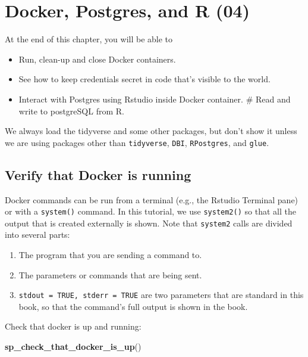 \documentclass[]{book}
\newenvironment{Shaded}{\begin{snugshade}}{\end{snugshade}}
\newcommand{\KeywordTok}[1]{\textcolor[rgb]{0.13,0.29,0.53}{\textbf{#1}}}
\newcommand{\NormalTok}[1]{#1}
\providecommand{\tightlist}{%
  \setlength{\itemsep}{0pt}\setlength{\parskip}{0pt}}
\theoremstyle{definition}
\theoremstyle{definition}
\theoremstyle{definition}
\theoremstyle{remark}
\begin{document}
\hypertarget{docker-postgres-and-r-04}{%
\chapter{Docker, Postgres, and R (04)}\label{docker-postgres-and-r-04}}

At the end of this chapter, you will be able to

\begin{itemize}
\tightlist
\item
  Run, clean-up and close Docker containers.
\item
  See how to keep credentials secret in code that's visible to the
  world.
\item
  Interact with Postgres using Rstudio inside Docker container. \# Read
  and write to postgreSQL from R.
\end{itemize}

We always load the tidyverse and some other packages, but don't show it
unless we are using packages other than \texttt{tidyverse},
\texttt{DBI}, \texttt{RPostgres}, and \texttt{glue}.

\hypertarget{verify-that-docker-is-running}{%
\section{Verify that Docker is
running}\label{verify-that-docker-is-running}}

Docker commands can be run from a terminal (e.g., the Rstudio Terminal
pane) or with a \texttt{system()} command. In this tutorial, we use
\texttt{system2()} so that all the output that is created externally is
shown. Note that \texttt{system2} calls are divided into several parts:

\begin{enumerate}
\def\labelenumi{\arabic{enumi}.}
\tightlist
\item
  The program that you are sending a command to.
\item
  The parameters or commands that are being sent.
\item
  \texttt{stdout\ =\ TRUE,\ stderr\ =\ TRUE} are two parameters that are
  standard in this book, so that the command's full output is shown in
  the book.
\end{enumerate}

Check that docker is up and running:

\begin{Shaded}
\begin{Highlighting}[]
\KeywordTok{sp_check_that_docker_is_up}\NormalTok{()}
\end{Highlighting}
\end{Shaded}
\end{document}
